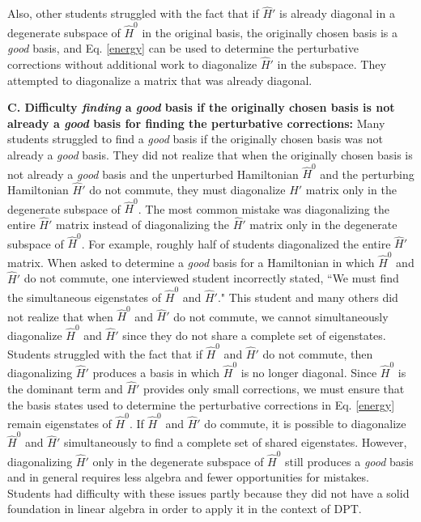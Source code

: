 \documentclass[aps,pra,showpacs,showkeys,twocolumn,groupedaddress]{revtex4-1}
\begin{document}
Also, other students struggled with the fact that if $\hat{H}'$ is already diagonal in a degenerate subspace of $\hat{H}^0$ in the original basis, 
the originally chosen basis is a {\it {\it good}} basis, and Eq. \ref{energy} can be used to determine the perturbative corrections without additional work to diagonalize $\hat{H}'$ in the subspace. They attempted to diagonalize a matrix that was already diagonal.

{\bf C. Difficulty {\it finding} a {\it good} basis if the originally chosen basis is not already a {\it good} basis for finding the perturbative corrections:} Many students struggled to find a {\it good} basis if the originally chosen basis was not already a {\it good} basis.  They did not realize that when the originally chosen basis is not already a {\it good} basis and the unperturbed Hamiltonian $\hat{H}^0$ and the perturbing Hamiltonian $\hat{H}'$ do not commute, they must diagonalize $\hat{H}'$ matrix only in the degenerate subspace of $\hat{H}^0$.  The most common mistake was diagonalizing the entire $\hat{H}'$ matrix instead of diagonalizing the $\hat{H}'$ matrix only in the degenerate subspace of $\hat{H}^0$. For example, roughly half 
of students 
diagonalized the entire $\hat{H}'$ matrix.  When asked to determine a {\it good} basis for a Hamiltonian in which $\hat{H}^0$ and $\hat{H}'$ do not commute, one interviewed student incorrectly stated, ``We must find the simultaneous eigenstates of $\hat{H}^0$ and $\hat{H}'$."  This student and many others did not realize that when $\hat{H}^0$ and $\hat{H}'$ do not commute, we cannot simultaneously diagonalize $\hat{H}^0$ and $\hat{H}'$ since they  do not share a complete set of eigenstates.  Students struggled with the fact that if $\hat{H}^0$ and $\hat{H}'$ do not commute, then diagonalizing $\hat{H}'$ produces a basis in which $\hat{H}^0$ is no longer diagonal.  Since $\hat{H}^0$ is the dominant term and $\hat{H}'$ provides only small corrections, we must ensure that the basis states used to determine the perturbative corrections in Eq. \ref{energy} remain eigenstates of $\hat{H}^0$.  If $\hat{H}^0$ and $\hat{H}'$ do commute, it is possible to diagonalize $\hat{H}^0$ and $\hat{H}'$ simultaneously to find a complete set of shared eigenstates.  However, diagonalizing $\hat{H}'$ only in the degenerate subspace of $\hat{H}^0$ still produces a {\it good} basis and in general requires less algebra and fewer opportunities for mistakes. Students had difficulty with these issues partly because they did not have a solid foundation in linear algebra in order to apply it in the context of DPT.
\end{document}
